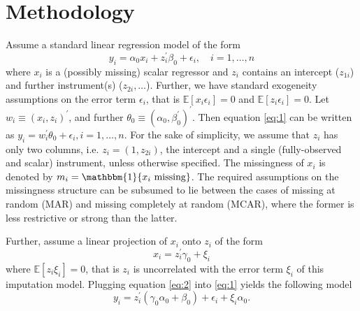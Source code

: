 \section{Methodology}
Assume a standard linear regression model of the form
\begin{equation}\label{eq:1}
    y_i = \alpha_0 x_i + z_i^{\prime} \beta_0 + \epsilon_i, \quad i= 1,\ldots,n
\end{equation}
where $x_i$ is a (possibly missing) scalar regressor and $z_i$ contains an intercept ($z_{1i}$) and further instrument(s) ($z_{2i}, \ldots$).
Further, we have standard exogeneity assumptions on the error term $\epsilon_i$, that is $\mathbb{E}[x_i \epsilon_i] = 0$ and $\mathbb{E}[z_i \epsilon_i] = 0$.
Let $w_i \equiv (x_i, z_i)^{\prime}$, and further $\theta_0 \equiv (\alpha_0, \beta_0^{\prime})^{\prime}$.
Then equation \eqref{eq:1} can be written as $y_i = w_i^{\prime} \theta_0 + \epsilon_i, i= 1,\ldots,n$.
For the sake of simplicity, we assume that $z_i$ has only two columns, i.e. $z_i = (1, z_{2i})$, the intercept and a single (fully-observed and scalar) instrument, unless otherwise specified.
The missingness of $x_i$ is denoted by $m_i = \mathbbm{1}\{x_i \text{ missing}\}$.
The required assumptions on the missingness structure can be subsumed to lie between the cases of missing at random (MAR) and missing completely at random (MCAR), where the former is less restrictive or strong than the latter.

Further, assume a linear projection of $x_i$ onto $z_i$ of the form
\begin{equation}\label{eq:2}
    x_i = z_i^{\prime} \gamma_0 + \xi_i
\end{equation}
where $\mathbb{E}[z_i \xi_i] = 0$, that is $z_i$ is uncorrelated with the error term $\xi_i$ of this imputation model.
Plugging equation \eqref{eq:2} into \eqref{eq:1} yields the following model
\begin{equation}\label{eq:3}
    y_i = z_i^{\prime} (\gamma_0 \alpha_0 + \beta_0) + \epsilon_i + \xi_i \alpha_0.
\end{equation}

